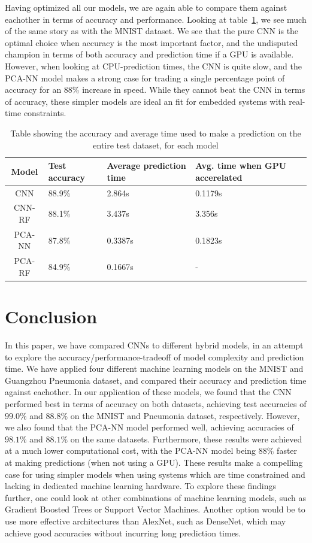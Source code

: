 \documentclass[onecolumn,10pt,cleanfoot]{asme2ej}
\begin{document}
Having optimized all our models, we are again able to compare them against eachother in terms of accuracy and performance. Looking at table~\ref{modcomppneu}, we see much of the same story as with the MNIST dataset. We see that the pure CNN is the optimal choice when accuracy is the most important factor, and the undisputed champion in terms of both accuracy and prediction time if a GPU is available. However, when looking at CPU-prediction times, the CNN is quite slow, and the PCA-NN model makes a strong case for trading a single percentage point of accuracy for an $88\%$ increase in speed. While they cannot beat the CNN in terms of accuracy, these simpler models are ideal an fit for embedded systems with real-time constraints.

\begin{table}[H]
\caption{Table showing the accuracy and average time used to make a prediction on the entire test dataset, for each model}
\begin{center}
\label{modcomppneu}
\begin{tabular}{| c | l | l | l |}
\hline
Model & Test accuracy & Average prediction time & Avg. time when GPU accerelated \\
\hline
CNN & 88.9\% & 2.864s & 0.1179s \\
CNN-RF & 88.1\% & 3.437s & 3.356s \\
PCA-NN & 87.8\% & 0.3387s & 0.1823s \\
PCA-RF & 84.9\% & 0.1667s & - \\
\hline
\end{tabular}
\end{center}
\end{table}

\section{Conclusion}

In this paper, we have compared CNNs to different hybrid models, in an attempt to explore the accuracy/performance-tradeoff of model complexity and prediction time. We have applied four different machine learning models on the MNIST and Guangzhou Pneumonia dataset, and compared their accuracy and prediction time against eachother. In our application of these models, we found that the CNN performed best in terms of accuracy on both datasets, achieving test accuracies of $99.0\%$ and $88.8\%$ on the MNIST and Pneumonia dataset, respectively. However, we also found that the PCA-NN model performed well, achieving accuracies of $98.1\%$ and $88.1\%$ on the same datasets. Furthermore, these results were achieved at a much lower computational cost, with the PCA-NN model being $88\%$ faster at making predictions (when not using a GPU). These results make a compelling case for using simpler models when using systems which are time constrained and lacking in dedicated machine learning hardware. To explore these findings further, one could look at other combinations of machine learning models, such as Gradient Boosted Trees or Support Vector Machines. Another option would be to use more effective architectures than AlexNet, such as DenseNet, which may achieve good accuracies without incurring long prediction times.



\end{document}
